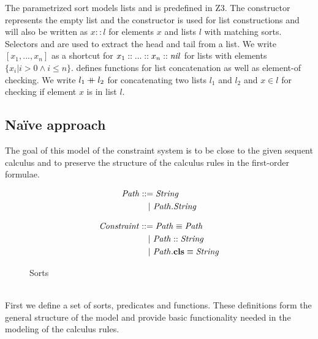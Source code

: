 The parametrized sort  models lists and
is predefined in Z3.
The constructor \nil represents the empty list and
the constructor  is used for list constructions
and  will also be written as $x :: l$
for elements $x$ and lists $l$ with matching sorts.
Selectors  and  are used to extract
the head and tail from a list.
We write $[x_1, ..., x_n]$ as a shortcut for
$x_1 :: ... :: x_n :: \mathit{nil}$ for lists with elements $\{x_i | i > 0 \land i \leq n\}$.
 defines functions for list concatenation
as well as element-of checking.
We write $l_1 \mathbin{+\mkern-10mu+} l_2$ for concatenating two lists $l_1$ and $l_2$
and $x \in l$ for checking if element $x$ is in list $l$.

\subsection{Na\"ive approach}
The goal of this model of the constraint system is to
be close to the given sequent calculus and to preserve
the structure of the calculus rules in the first-order formulae.\\
\begin{figure}[t]
\centering
\begin{subfigure}[c]{0.45\textwidth}
\begin{align*}
\mathit{Path} &::=
     \mathit{String}\\
  &\quad|\ \mathit{Path.String}
\end{align*}
\end{subfigure}
\begin{subfigure}[c]{0.45\textwidth}
\begin{align*}
\mathit{Constraint} &::=
     \mathit{Path} \equiv \mathit{Path}\\
  &\quad|\ \mathit{Path} :: \mathit{String}\\
  &\quad|\ \mathit{Path}.\textbf{cls} \equiv \mathit{String}
\end{align*}
\end{subfigure}
\caption{Sorts}
\label{subfig:axioms-naive-general-sorts}
\end{figure}\\
First we define a set of sorts, predicates and functions.
These definitions form the general structure of the model
and provide basic functionality needed in the modeling of the calculus rules.

